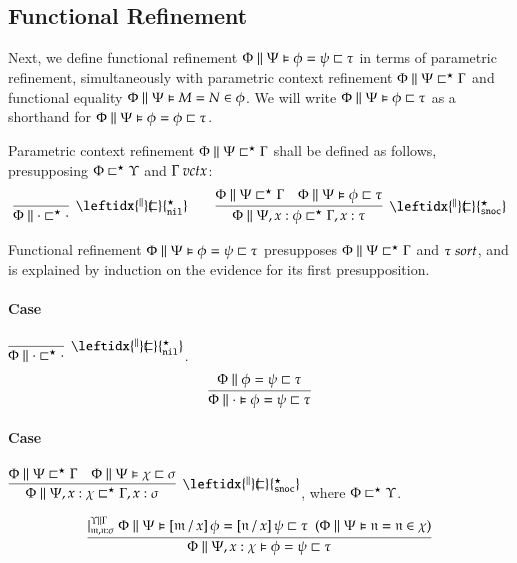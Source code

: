 \documentclass[11pt]{article}
\theoremstyle{definition}
\theoremstyle{remark}
\numberwithin{equation}{section}
\def\IModeColorName{MidnightBlue}
\def\OModeColorName{Maroon}
\def\IModeColorName{Black}
\def\OModeColorName{Black}
\newcommand\IMode[1]{{\color{\IModeColorName}{#1}}}
\newcommand\OMode[1]{{\color{\OModeColorName}{#1}}}
\newcommand\HypJ[2]{#1\ \ (#2)}
\newcommand\HPGenJ[4]{\vert^{\IMode{#1}\parallel\IMode{#2}}_{\IMode{#3}}\; #4}
\newcommand\IsSort[1]{\IMode{#1}\ \textit{sort}}
\newcommand\IsVarCtx[1]{\IMode{#1}\ \textit{vctx}}
\newcommand\MV[1]{\mathfrak{#1}}
\newcommand\Subst[3]{%
  \left[#1\, /\, #2\right]#3%
}
\newcommand\RefinesCtx[2]{\IMode{#1}\sqsubset^\star\OMode{#2}}
\newcommand\EqRefines[4]{\IMode{#1}\parallel\IMode{#2}=\IMode{#3}\sqsubset\OMode{#4}}
\newcommand\HRefines[4]{\IMode{#1}\parallel\IMode{#2}\vDash\IMode{#3}\sqsubset\OMode{#4}}
\newcommand\HEqRefines[5]{\IMode{#1}\parallel\IMode{#2}\vDash\IMode{#3}=\IMode{#4}\sqsubset\OMode{#5}}
\newcommand\PRefinesCtx[3]{\IMode{#1}\parallel\IMode{#2}\sqsubset^\star\OMode{#3}}
\newcommand\HRMemEq[5]{\IMode{#1}\parallel\IMode{#2}\vDash\IMode{#3}=\IMode{#4}\in\IMode{#5}}
\begin{document}
\subsection{Functional Refinement}

\newcommand\PRefinesCtxNil{\leftidx{^\parallel}{\!\!\sqsubset}{^\star_{\mathtt{nil}}}}
\newcommand\PRefinesCtxSnoc{\leftidx{^\parallel}{\!\!\sqsubset}{^\star_{\mathtt{snoc}}}}

Next, we define functional refinement
$\HEqRefines{\Phi}{\Psi}{\phi}{\psi}{\tau}$ in terms of parametric refinement,
simultaneously with parametric context refinement
$\PRefinesCtx{\Phi}{\Psi}{\Gamma}$ and functional equality
$\HRMemEq{\Phi}{\Psi}{M}{N}{\phi}$. We will write
$\HRefines{\Phi}{\Psi}{\phi}{\tau}$ as a shorthand for
$\HEqRefines{\Phi}{\Psi}{\phi}{\phi}{\tau}$.

\newcommand\DefPRefinesCtxNil[1]{
  \infer[\PRefinesCtxNil]{
    \PRefinesCtx{#1}{\cdot}{\cdot}
  }{
  }
}
\newcommand\DefPRefinesCtxSnoc[6]{
  \infer[\PRefinesCtxSnoc]{
    \PRefinesCtx{#1}{#2,#3:#4}{#5,#3:#6}
  }{
    \PRefinesCtx{#1}{#2}{#5} &
    \HRefines{#1}{#2}{#4}{#6}
  }
}

Parametric context refinement $\PRefinesCtx{\Phi}{\Psi}{\Gamma}$ shall be
defined as follows, presupposing $\RefinesCtx{\Phi}{\Upsilon}$ and
$\IsVarCtx{\Gamma}$:
\begin{gather*}
  \DefPRefinesCtxNil{\Phi}\qquad
  \DefPRefinesCtxSnoc{\Phi}{\Psi}{x}{\phi}{\Gamma}{\tau}
\end{gather*}

Functional refinement $\HEqRefines{\Phi}{\Psi}{\phi}{\psi}{\tau}$ presupposes
$\PRefinesCtx{\Phi}{\Psi}{\Gamma}$ and $\IsSort{\tau}$, and is explained by
induction on the evidence for its first presupposition.

\paragraph{Case} $\DefPRefinesCtxNil{\Phi}$.
\[
  \infer{
    \HEqRefines{\Phi}{\cdot}{\phi}{\psi}{\tau}
  }{
    \EqRefines{\Phi}{\phi}{\psi}{\tau}
  }
\]

\paragraph{Case} $\DefPRefinesCtxSnoc{\Phi}{\Psi}{x}{\chi}{\Gamma}{\sigma}$,
where $\RefinesCtx{\Phi}{\Upsilon}$.

\begin{gather*}
  \infer{
    \HEqRefines{\Phi}{\Psi,x:\chi}{\phi}{\psi}{\tau}
  }{
    \HPGenJ{\Upsilon}{\Gamma}{\MV{m},\MV{n}:\sigma}{
      \HypJ{
        \HEqRefines{\Phi}{\Psi}{
          \Subst{\MV{m}}{x}{\phi}
        }{
          \Subst{\MV{n}}{x}{\psi}
        }{\tau}
      }{
        \HRMemEq{\Phi}{\Psi}{\MV{n}}{\MV{n}}{\chi}
      }
    }
  }
\end{gather*}
\end{document}
